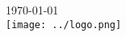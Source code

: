 \documentclass[a4paper, 8pt, oneside]{Thesis}  %
\begin{document}
\begin{titlepage}


{\large \today}\\[2cm] %


\texttt{[image: ../logo.png]}\\[0.5cm] %
 

\vfill %

\end{titlepage}




\pagestyle{fancy}  %


\tableofcontents  %
\clearpage

\end{document}

